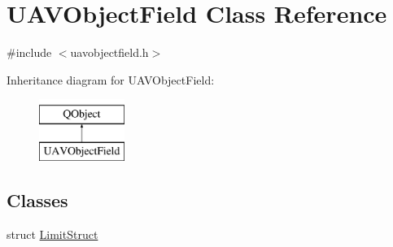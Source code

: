 \hypertarget{class_u_a_v_object_field}{\section{U\-A\-V\-Object\-Field Class Reference}
\label{class_u_a_v_object_field}
}


{\ttfamily \#include $<$uavobjectfield.\-h$>$}

Inheritance diagram for U\-A\-V\-Object\-Field\-:\begin{figure}[H]
\begin{center}
\leavevmode
\includegraphics[height=2.000000cm]{class_u_a_v_object_field}
\end{center}
\end{figure}
\subsection*{Classes}
\begin{DoxyCompactItemize}
\item 
struct \hyperlink{struct_u_a_v_object_field_1_1_limit_struct}{Limit\-Struct}
\end{DoxyCompactItemize}

